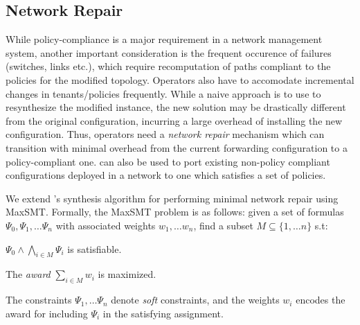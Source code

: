 \subsection{Network Repair}
While policy-compliance is a major requirement in a network management system,
another important consideration is the frequent occurence of failures (switches, links etc.),
which require recomputation of paths compliant to the policies for the modified topology. Operators also have to accomodate incremental changes in tenants/policies frequently. 
While a naive approach is to use \name to resynthesize the modified instance,
the new solution may be drastically different from the original configuration, incurring a
large overhead of installing the new configuration. Thus, operators
need a \emph{network repair} mechanism which can transition with minimal
overhead from the current
forwarding configuration to a policy-compliant one. 
\name can also be used to
port existing non-policy compliant configurations deployed in a network to
one which satisfies a set of policies.

We extend \name's synthesis algorithm for performing
minimal network repair using MaxSMT.  
Formally, the MaxSMT problem is as follows: given a set
of formulas $\Psi_0, \Psi_1, \ldots \Psi_n$ with associated 
weights $w_1, \ldots w_n$, find a subset $M \subseteq \{1, \ldots n\}$
s.t: 
\begin{compactenumerate}
	\item $\Psi_0 \wedge \bigwedge_{i \in M} \Psi_i$ is satisfiable.
	\item The \emph{award} $\sum_{i \in M} w_i$  is maximized.
\end{compactenumerate}
The constraints $\Psi_1, \ldots \Psi_n$ denote \emph{soft} constraints, and
the weights $w_i$ encodes the award for including $\Psi_i$ in the satisfying
assignment. 


